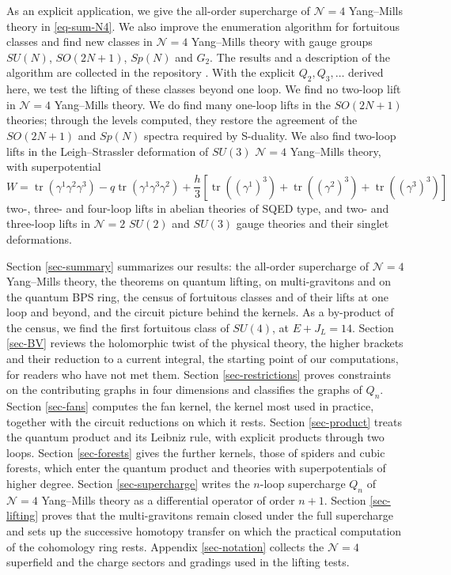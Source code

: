 \documentclass[11pt]{article}
\numberwithin{equation}{section}
\numberwithin{figure}{section}
\numberwithin{table}{section}
\begin{document}
As an explicit application, we give the all-order supercharge of $\mathcal N=4$ Yang--Mills theory in \eqref{eq-sum-N4}. We also improve the enumeration algorithm for fortuitous classes and find new classes in $\mathcal N=4$ Yang--Mills theory with gauge groups $SU(N)$, $SO(2N+1)$, $Sp(N)$ and $G_2$. The results and a description of the algorithm are collected in the repository \cite{Repo}. With the explicit $Q_2,Q_3,\ldots$ derived here, we test the lifting of these classes beyond one loop. We find no two-loop lift in $\mathcal N=4$ Yang--Mills theory. We do find many one-loop lifts in the $SO(2N+1)$ theories; through the levels computed, they restore the agreement of the $SO(2N+1)$ and $Sp(N)$ spectra required by S-duality. We also find two-loop lifts in the Leigh--Strassler deformation \cite{LeighStrassler} of $SU(3)$ $\mathcal N=4$ Yang--Mills theory, with superpotential
\begin{equation*}
W=\operatorname{tr}(\gamma^1\gamma^2\gamma^3)-q\operatorname{tr}(\gamma^1\gamma^3\gamma^2)+\frac{h}{3}\left[\operatorname{tr}((\gamma^1)^3)+\operatorname{tr}((\gamma^2)^3)+\operatorname{tr}((\gamma^3)^3)\right]
\end{equation*}
two-, three- and four-loop lifts in abelian theories of SQED type, and two- and three-loop lifts in $\mathcal N=2$ $SU(2)$ and $SU(3)$ gauge theories and their singlet deformations.

Section \ref{sec-summary} summarizes our results: the all-order supercharge of $\mathcal N=4$ Yang--Mills theory, the theorems on quantum lifting, on multi-gravitons and on the quantum BPS ring, the census of fortuitous classes and of their lifts at one loop and beyond, and the circuit picture behind the kernels. As a by-product of the census, we find the first fortuitous class of $SU(4)$, at $E+J_L=14$. Section \ref{sec-BV} reviews the holomorphic twist of the physical theory, the higher brackets and their reduction to a current integral, the starting point of our computations, for readers who have not met them. Section \ref{sec-restrictions} proves constraints on the contributing graphs in four dimensions and classifies the graphs of $Q_n$. Section \ref{sec-fans} computes the fan kernel, the kernel most used in practice, together with the circuit reductions on which it rests. Section \ref{sec-product} treats the quantum product and its Leibniz rule, with explicit products through two loops. Section \ref{sec-forests} gives the further kernels, those of spiders and cubic forests, which enter the quantum product and theories with superpotentials of higher degree. Section \ref{sec-supercharge} writes the $n$-loop supercharge $Q_n$ of $\mathcal N=4$ Yang--Mills theory as a differential operator of order $n+1$. Section \ref{sec-lifting} proves that the multi-gravitons remain closed under the full supercharge and sets up the successive homotopy transfer on which the practical computation of the cohomology ring rests. Appendix \ref{sec-notation} collects the $\mathcal N=4$ superfield and the charge sectors and gradings used in the lifting tests.
\end{document}
